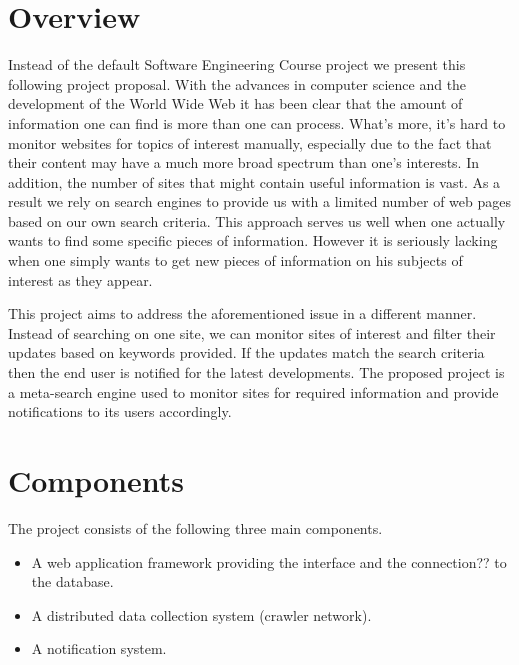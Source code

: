\documentclass[a4paper,10pt]{article} \usepackage{anysize}
\begin{document}



\section{Overview}
    Instead of the default Software Engineering Course project we present
    this following project proposal. With the advances in computer science and
    the development of the World Wide Web it has been clear that the amount
    of information one can find is more than one can process. What's more, it's
    hard to monitor websites for topics of interest manually, especially due to
    the fact that their content may have a much more broad spectrum than one's
    interests. In addition, the number of sites that might contain useful
    information is vast. As a result we rely on search engines to provide us
    with a limited number of web pages based on our own search criteria. This
    approach serves us well when one actually wants to find some specific
    pieces of information. However it is seriously lacking when one simply
    wants to get new pieces of information on his subjects of interest as they
    appear. 

    This project aims to address the aforementioned issue in a different
    manner. Instead of searching on one site, we can monitor sites of
    interest and filter their updates based on keywords provided. If the
    updates match the search criteria then the end user is notified for the
    latest developments. The proposed project is a meta-search engine used to
    monitor sites for required information and provide notifications to its
    users accordingly. 

\section{Components}
    The project consists of the following three main components.
    \begin{itemize}
        \item A web application framework providing the interface and the
            connection?? to the database.
        \item A distributed data collection system (crawler network).
        \item A notification system.
    \end{itemize}
\end{document}
